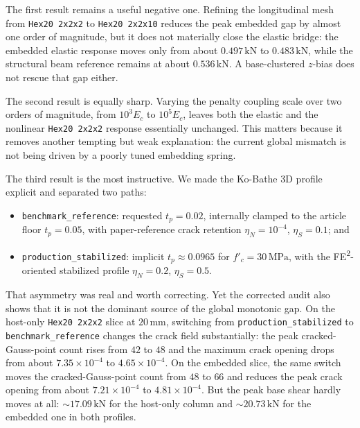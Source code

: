 The first result remains a useful negative one. Refining the longitudinal mesh
from \texttt{Hex20 2x2x2} to \texttt{Hex20 2x2x10} reduces the peak embedded
gap by almost one order of magnitude, but it does not materially close the
elastic bridge: the embedded elastic response moves only from about
\(0.497\,\mathrm{kN}\) to \(0.483\,\mathrm{kN}\), while the structural beam
reference remains at about \(0.536\,\mathrm{kN}\).  A base-clustered
\(z\)-bias does not rescue that gap either.

The second result is equally sharp. Varying the penalty coupling scale over two
orders of magnitude, from \(10^3 E_c\) to \(10^5 E_c\), leaves both the
elastic and the nonlinear \texttt{Hex20 2x2x2} response essentially unchanged.
This matters because it removes another tempting but weak explanation: the
current global mismatch is not being driven by a poorly tuned embedding spring.

The third result is the most instructive. We made the Ko-Bathe 3D profile
explicit and separated two paths:
\begin{itemize}
  \item \texttt{benchmark\_reference}: requested
    \(t_p = 0.02\), internally clamped to the article floor
    \(t_p = 0.05\), with paper-reference crack retention
    \(\eta_N = 10^{-4}\), \(\eta_S = 0.1\); and
  \item \texttt{production\_stabilized}: implicit
    \(t_p \approx 0.0965\) for \(f'_c = 30\,\mathrm{MPa}\), with the
    FE\textsuperscript{2}-oriented stabilized profile
    \(\eta_N = 0.2\), \(\eta_S = 0.5\).
\end{itemize}

That asymmetry was real and worth correcting. Yet the corrected audit also
shows that it is not the dominant source of the global monotonic gap. On the
host-only \texttt{Hex20 2x2x2} slice at \(20\,\mathrm{mm}\), switching from
\texttt{production\_stabilized} to \texttt{benchmark\_reference} changes the
crack field substantially: the peak cracked-Gauss-point count rises from
\(42\) to \(48\) and the maximum crack opening drops from about
\(7.35\times10^{-4}\) to \(4.65\times10^{-4}\).  On the embedded slice, the
same switch moves the cracked-Gauss-point count from \(48\) to \(66\) and
reduces the peak crack opening from about \(7.21\times10^{-4}\) to
\(4.81\times10^{-4}\).  But the peak base shear hardly moves at all:
\(\sim 17.09\,\mathrm{kN}\) for the host-only column and
\(\sim 20.73\,\mathrm{kN}\) for the embedded one in both profiles.

